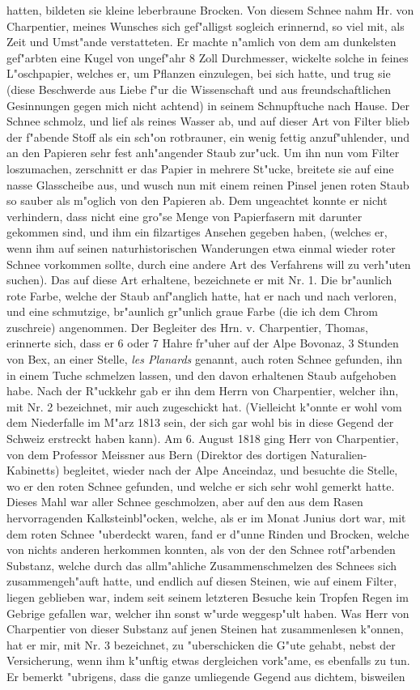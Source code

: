 \documentclass[a4paper, 11pt, oneside, polutonikogreek, german]{article}
\begin{document}
hatten, bildeten sie kleine leberbraune Brocken. Von diesem Schnee nahm Hr. von Charpentier, meines Wunsches sich gef"alligst sogleich erinnernd, so viel mit, als Zeit und Umst"ande verstatteten. Er machte n"amlich von dem am dunkelsten gef"arbten eine Kugel von ungef"ahr 8 Zoll Durchmesser, wickelte solche in feines L"oschpapier, welches er, um Pflanzen einzulegen, bei sich hatte, und trug sie (diese Beschwerde aus Liebe f"ur die Wissenschaft und aus freundschaftlichen Gesinnungen gegen mich nicht achtend) in seinem Schnupftuche nach Hause. Der Schnee schmolz, und lief als reines Wasser ab, und auf dieser Art von Filter blieb der f"abende Stoff als ein sch"on rotbrauner, ein wenig fettig anzuf"uhlender, und an den Papieren sehr fest anh"angender Staub zur"uck. Um ihn nun vom Filter loszumachen, zerschnitt er das Papier in mehrere St"ucke, breitete sie auf eine nasse Glasscheibe aus, und wusch nun mit einem reinen Pinsel jenen roten Staub so sauber als m"oglich von den Papieren ab. Dem ungeachtet konnte er nicht verhindern, dass nicht eine gro"se Menge von Papierfasern mit darunter gekommen sind, und ihm ein filzartiges Ansehen gegeben haben, (welches er, wenn ihm auf seinen naturhistorischen Wanderungen etwa einmal wieder roter Schnee vorkommen sollte, durch eine andere Art des Verfahrens will zu verh"uten suchen). Das auf diese Art erhaltene, bezeichnete er mit Nr. 1. Die br"aunlich rote Farbe, welche der Staub anf"anglich hatte, hat er nach und nach verloren, und eine schmutzige, br"aunlich gr"unlich graue Farbe (die ich dem Chrom zuschreie) angenommen. Der Begleiter des Hrn. v. Charpentier, Thomas, erinnerte sich, dass er 6 oder 7 Hahre fr"uher auf der Alpe Bovonaz, 3 Stunden von Bex, an einer Stelle, \emph{les Planards} genannt, auch roten Schnee gefunden, ihn in einem Tuche schmelzen lassen, und den davon erhaltenen Staub aufgehoben habe. Nach der R"uckkehr gab er ihn dem Herrn von Charpentier, welcher ihn, mit Nr. 2 bezeichnet, mir auch zugeschickt hat. (Vielleicht k"onnte er wohl vom dem Niederfalle im M"arz 1813 sein, der sich gar wohl bis in diese Gegend der Schweiz erstreckt haben kann). Am 6. August 1818 ging Herr von Charpentier, von dem Professor Meissner aus Bern (Direktor des dortigen Naturalien-Kabinetts) begleitet, wieder nach der Alpe Anceindaz, und besuchte die Stelle, wo er den roten Schnee gefunden, und welche er sich sehr wohl gemerkt hatte. Dieses Mahl war aller Schnee geschmolzen, aber auf den aus dem Rasen hervorragenden Kalksteinbl"ocken, welche, als er im Monat Junius dort war, mit dem roten Schnee "uberdeckt waren, fand er d"unne Rinden und Brocken, welche von nichts anderen herkommen konnten, als von der den Schnee rotf"arbenden Substanz, welche durch das allm"ahliche Zusammenschmelzen des Schnees sich zusammengeh"auft hatte, und endlich auf diesen Steinen, wie auf einem Filter, liegen geblieben war, indem seit seinem letzteren Besuche kein Tropfen Regen im Gebrige gefallen war, welcher ihn sonst w"urde weggesp"ult haben. Was Herr von Charpentier von dieser Substanz auf jenen Steinen hat zusammenlesen k"onnen, hat er mir, mit Nr. 3 bezeichnet, zu "uberschicken die G"ute gehabt, nebst der Versicherung, wenn ihm k"unftig etwas dergleichen vork"ame, es ebenfalls zu tun. Er bemerkt "ubrigens, dass die ganze umliegende Gegend aus dichtem, bisweilen 
\end{document}
